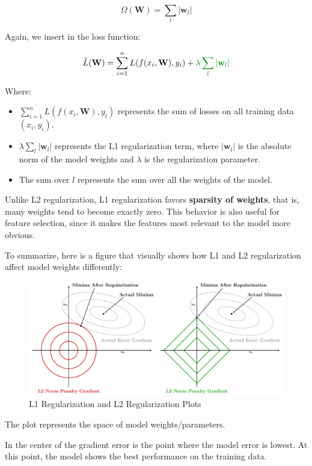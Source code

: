 $$
\Omega(\mathbf{W}) = \sum_{l} |\mathbf{w}_l|
$$

Again, we insert in the loss function:

$$
\tilde{L}(\mathbf{W}) = \sum_{i=1}^{n} L(f(x_i, \mathbf{W}), y_i) + \textcolor{mygreen!90!black}{\lambda \sum_{l} |\mathbf{w}_l|}
$$

Where:
\begin{itemize}
    \item $\sum_{i=1}^{n} L(f(x_i, \mathbf{W}), y_i)$ represents the sum of losses on all training data $(x_i, y_i)$.
    \item $\lambda \sum_{l} |\mathbf{w}_l|$ represents the L1 regularization term, where $|\mathbf{w}_l|$ is the absolute norm of the model weights and $\lambda$ is the regularization parameter.
    \item The sum over $l$ represents the sum over all the weights of the model.
\end{itemize}

Unlike L2 regularization, L1 regularization favors \textbf{sparsity of weights}, that is, many weights tend to become exactly zero. This behavior is also useful for feature selection, since it makes the features most relevant to the model more obvious.

To summarize, here is a figure that visually shows how L1 and L2 regularization affect model weights differently:

\begin{figure}[!htbp]
    \centering
    \includegraphics[width = \linewidth]{tikz/chapter4 - L1 and L2 plot.pdf}
    \caption{L1 Regularization and L2 Regularization Plots}
\end{figure}


The plot represents the space of model weights/parameters.

In the center of the gradient error is the point where the model error is lowest. At this point, the model shows the best performance on the training data.

